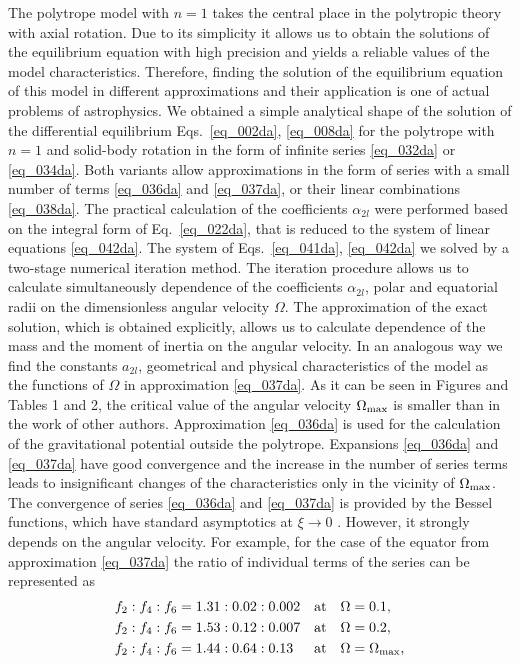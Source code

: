 \documentclass{caosp308}
\begin{document}
The polytrope model with $n=1$ takes the central place in the polytropic theory with axial rotation. Due to its simplicity it allows us to obtain the solutions of the equilibrium equation with high precision and yields a reliable values of the model characteristics. Therefore, finding the solution of the equilibrium equation of this model in different approximations and their application is one of actual problems of astrophysics. We obtained a simple analytical shape of the solution of the differential equilibrium Eqs.~\eqref{eq_002da}, \eqref{eq_008da} for the polytrope with $n=1$ and solid-body rotation in the form of infinite series \eqref{eq_032da} or \eqref{eq_034da}. Both variants allow approximations in the form of series with a small number of terms \eqref{eq_036da} and \eqref{eq_037da}, or their linear combinations \eqref{eq_038da}. The practical calculation of the coefficients $\alpha_{2l}$ were performed based on the integral form of  Eq.~\eqref{eq_022da}, that is reduced to the system of linear equations \eqref{eq_042da}. The system of  Eqs.~\eqref{eq_041da}, \eqref{eq_042da} we solved by a two-stage numerical iteration method. The iteration procedure allows us to calculate simultaneously dependence of the coefficients $\alpha_{2l}$, polar and equatorial radii on the dimensionless angular velocity $\Omega$. The approximation of the exact solution, which is obtained explicitly, allows us to calculate dependence of the mass and the moment of inertia on the angular velocity. In an analogous way we find the constants $a_{2l}$, geometrical and physical characteristics of the model as the functions of $\Omega$ in approximation \eqref{eq_037da}. As it can be seen in Figures and Tables 1 and 2, the critical value of the angular velocity $\Omega_{\rm max}$ is smaller than in the work of other authors. Approximation \eqref{eq_036da} is used for the calculation of the gravitational potential outside the polytrope. Expansions \eqref{eq_036da} and \eqref{eq_037da} have good convergence and the increase in the number of series terms leads to insignificant changes of the characteristics only in the vicinity of $\Omega_{\rm max}$. The convergence of series \eqref{eq_036da} and \eqref{eq_037da} is provided by the Bessel functions, which have standard asymptotics at $\xi\rightarrow0$ \citep{1970hmfw.book.....A}. However, it strongly depends on the angular velocity. For example, for the case of the equator from approximation \eqref{eq_037da} the ratio of individual terms of the series can be represented as
\begin{eqnarray*}
\begin{split}
&f_2:f_4:f_6=1.31:0.02:0.002\quad\text{at}\quad\Omega=0.1,\\
&f_2:f_4:f_6=1.53:0.12:0.007\quad\text{at}\quad\Omega=0.2,\\
&f_2:f_4:f_6=1.44:0.64:0.13\quad\,\,\,\text{at}\quad\Omega=\Omega_{\rm max},\\
\end{split}
\end{eqnarray*}   
\end{document}
